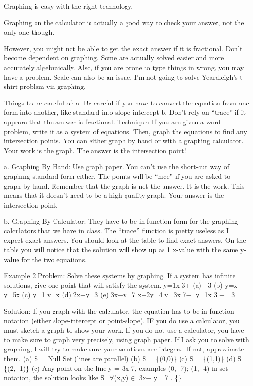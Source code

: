 Graphing is easy with the right technology.

Graphing on the calculator is actually a good way to check your answer, not the only one though.

However, you might not be able to get the exact answer if it is fractional. Don't become dependent on graphing. Some are actually solved easier and more accurately algebraically. Also, if you are prone to type things in wrong, you may have a problem. Scale can also be an issue. I'm not going to solve Yeardleigh's t-shirt problem via graphing.

Things to be careful of:
a. Be careful if you have to convert the equation from one form into another, like standard into slope-intercept
b. Don't rely on ``trace'' if it appears that the answer is fractional.
Technique: If you are given a word problem, write it as a system of equations. Then, graph the equations to find any intersection points. You can either graph by hand or with a graphing calculator. Your work is the graph. The answer is the intersection point!


a.
Graphing By Hand: Use graph paper. You can't use the short-cut way of graphing standard form either. The points will be ``nice'' if you are asked to graph by hand. Remember that the graph is not the answer. It is the work. This means that it doesn't need to be a high quality graph. Your answer is the intersection point.

b. Graphing By Calculator: They have to be in function form for the graphing calculators that we have in class. The ``trace'' function is pretty useless as I expect exact answers. You should look at the table to find exact answers. On the table you will notice that the solution will show up as 1 x-value with the same y-value for the two equations.

Example 2
Problem: Solve these systems by graphing. If a system has infinite solutions, give one point that will satisfy the system.
 y=1x 3+ (a)  3
(b) y=x y=5x
(c) y=1 y=x
(d) 2x+y=3 (e) 3x−y=7 x−2y=4 y=3x 7−
 y=1x 3 −  3

Solution:
 If you graph with the calculator, the equation has to be in function notation (either slope-intercept or point-slope). IF you do use a calculator, you must sketch a graph to show your work. If you do not use a calculator, you have to make sure to graph very precisely, using graph paper. If I ask you to solve with graphing, I will try to make sure your solutions are integers. If not, approximate them.
(a) S = Null Set (lines are parallel) (b) S = \{(0,0)\}
(c) S = \{(1,1)\}
(d) S = \{(2, -1)\}
(e) Any point on the line y = 3x-7, examples (0, -7); (1, -4) in set notation, the solution looks like
S=$\forall$(x,y)$\in$ 3x− y= 7 . \{\}

